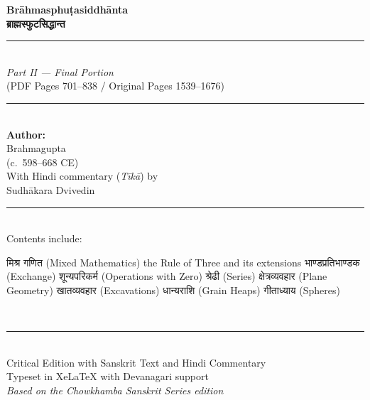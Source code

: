 \documentclass[11pt,a4paper]{article}
\newcommand{\longline}{\noindent\rule{\textwidth}{0.4pt}}
\newcommand{\dev}[1]{{\devanagarifont #1}}
\begin{document}
\begin{titlepage}
\centering
\vspace*{2cm}

{\Huge\bfseries\color{titlecolor} Brāhmasphuṭasiddhānta}\\[0.8cm]
{\LARGE\bfseries\color{sectioncolor} ब्राह्मस्फुटसिद्धान्त}\\[1.5cm]

\longline\\[0.8cm]
{\Large\textit{Part II — Final Portion}}\\[0.3cm]
{\large (PDF Pages 701–838 / Original Pages 1539–1676)}\\[1cm]
\longline\\[1.5cm]

{\Large\textbf{Author:}}\\[0.3cm]
{\LARGE Brahmagupta}\\[0.3cm]
{\large (c.\ 598–668 CE)}\\[1.5cm]

{\large With Hindi commentary (\textit{Tīkā}) by}\\[0.3cm]
{\Large Sudhākara Dvivedin}\\[2cm]

\longline\\[0.8cm]
{\large Contents include:}\\[0.3cm]
{\normalsize
\begin{minipage}{0.8\textwidth}
\centering
\dev{मिश्र गणित} (Mixed Mathematics) \textbullet
the Rule of Three and its extensions \textbullet
\dev{भाण्डप्रतिभाण्डक} (Exchange) \textbullet
\dev{शून्यपरिकर्म} (Operations with Zero) \textbullet
\dev{श्रेढी} (Series) \textbullet
\dev{क्षेत्रव्यवहार} (Plane Geometry) \textbullet
\dev{खातव्यवहार} (Excavations) \textbullet
\dev{धान्यराशि} (Grain Heaps) \textbullet
\dev{गीताध्याय} (Spheres)
\end{minipage}
}\\[1cm]
\longline\\[1cm]

{\large Critical Edition with Sanskrit Text and Hindi Commentary}\\[0.5cm]
{\small Typeset in XeLaTeX with Devanagari support}\\[2cm]

\vfill
{\small\textit{Based on the Chowkhamba Sanskrit Series edition}}
\end{titlepage}

\newpage
\tableofcontents
\newpage
\end{document}
